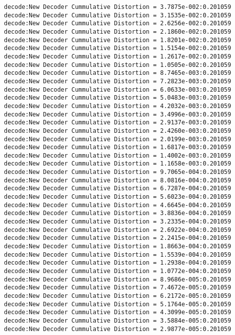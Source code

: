 \begin{verbatim}
decode:New Decoder Cummulative Distortion = 3.7875e-002:0.201059
decode:New Decoder Cummulative Distortion = 3.1535e-002:0.201059
decode:New Decoder Cummulative Distortion = 2.6256e-002:0.201059
decode:New Decoder Cummulative Distortion = 2.1860e-002:0.201059
decode:New Decoder Cummulative Distortion = 1.8201e-002:0.201059
decode:New Decoder Cummulative Distortion = 1.5154e-002:0.201059
decode:New Decoder Cummulative Distortion = 1.2617e-002:0.201059
decode:New Decoder Cummulative Distortion = 1.0505e-002:0.201059
decode:New Decoder Cummulative Distortion = 8.7465e-003:0.201059
decode:New Decoder Cummulative Distortion = 7.2823e-003:0.201059
decode:New Decoder Cummulative Distortion = 6.0633e-003:0.201059
decode:New Decoder Cummulative Distortion = 5.0483e-003:0.201059
decode:New Decoder Cummulative Distortion = 4.2032e-003:0.201059
decode:New Decoder Cummulative Distortion = 3.4996e-003:0.201059
decode:New Decoder Cummulative Distortion = 2.9137e-003:0.201059
decode:New Decoder Cummulative Distortion = 2.4260e-003:0.201059
decode:New Decoder Cummulative Distortion = 2.0199e-003:0.201059
decode:New Decoder Cummulative Distortion = 1.6817e-003:0.201059
decode:New Decoder Cummulative Distortion = 1.4002e-003:0.201059
decode:New Decoder Cummulative Distortion = 1.1658e-003:0.201059
decode:New Decoder Cummulative Distortion = 9.7065e-004:0.201059
decode:New Decoder Cummulative Distortion = 8.0816e-004:0.201059
decode:New Decoder Cummulative Distortion = 6.7287e-004:0.201059
decode:New Decoder Cummulative Distortion = 5.6023e-004:0.201059
decode:New Decoder Cummulative Distortion = 4.6645e-004:0.201059
decode:New Decoder Cummulative Distortion = 3.8836e-004:0.201059
decode:New Decoder Cummulative Distortion = 3.2335e-004:0.201059
decode:New Decoder Cummulative Distortion = 2.6922e-004:0.201059
decode:New Decoder Cummulative Distortion = 2.2415e-004:0.201059
decode:New Decoder Cummulative Distortion = 1.8663e-004:0.201059
decode:New Decoder Cummulative Distortion = 1.5539e-004:0.201059
decode:New Decoder Cummulative Distortion = 1.2938e-004:0.201059
decode:New Decoder Cummulative Distortion = 1.0772e-004:0.201059
decode:New Decoder Cummulative Distortion = 8.9686e-005:0.201059
decode:New Decoder Cummulative Distortion = 7.4672e-005:0.201059
decode:New Decoder Cummulative Distortion = 6.2172e-005:0.201059
decode:New Decoder Cummulative Distortion = 5.1764e-005:0.201059
decode:New Decoder Cummulative Distortion = 4.3099e-005:0.201059
decode:New Decoder Cummulative Distortion = 3.5884e-005:0.201059
decode:New Decoder Cummulative Distortion = 2.9877e-005:0.201059

\end{verbatim}
